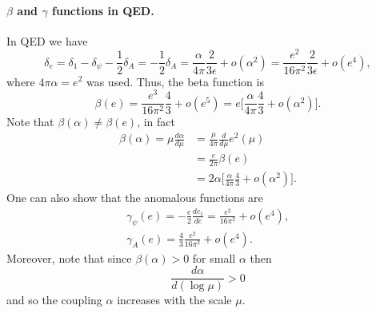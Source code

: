\paragraph{$\beta$ and $\gamma$ functions in QED.} In QED we have
\begin{equation}
    \delta_e = \delta_1 - \delta_\psi - \frac{1}{2}\delta_A = -\frac{1}{2}\delta_A = \frac{\alpha}{4\pi}\frac{2}{3\epsilon} + o(\alpha^2) = \frac{e^2}{16\pi^2}\frac{2}{3\epsilon} + o (e^4),
\end{equation}
where $4\pi\alpha = e^2$ was used. Thus, the  beta function is
\begin{equation}
    \beta(e) = \frac{e^3}{16\pi^2}\frac{4}{3} + o(e^5) = e\bigg[\frac{\alpha}{4\pi}\frac{4}{3} + o(\alpha^2)\bigg].
\end{equation}
Note that $\beta(\alpha) \neq \beta(e)$, in fact
\begin{equation}
    \begin{split}
        \beta(\alpha) = \mu\frac{d\alpha}{d\mu} &= \frac{\mu}{4\pi}\frac{d}{d\mu}e^2(\mu) \\
        &= \frac{e}{2\pi}\beta(e) \\
        &= 2\alpha\bigg[\frac{\alpha}{4\pi}\frac{4}{3} + o(\alpha^2)\bigg].
    \end{split}
\end{equation}
One can also show that the anomalous functions are
\begin{gather}
    \gamma_\psi(e) = -\frac{e}{2}\frac{dc_1}{de} = \frac{e^2}{16\pi^2} + o(e^4), \\
    \gamma_A(e) = \frac{4}{3}\frac{e^2}{16\pi^2} + o(e^4).
\end{gather}
Moreover, note that since $\beta(\alpha) > 0$ for small $\alpha$ then
\begin{equation}
    \frac{d\alpha}{d(\log{\mu})} > 0
\end{equation}
and so the coupling $\alpha$ increases with the scale $\mu$.

